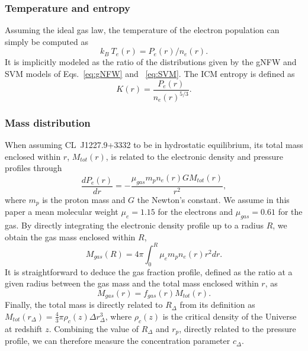 \documentclass[twocolumn,traditabstract]{aa}
\begin{document}
\subsubsection{Temperature and entropy}\label{sec:icm_param_tk}
Assuming the ideal gas law, the temperature of the electron population can simply be computed as
\begin{equation}
	k_B \ T_e(r) = P_e(r) / n_e(r).
	\label{eq:temp_profile}
\end{equation}
It is implicitly modeled as the ratio of the distributions given by the gNFW and SVM models of Eqs.~\ref{eq:gNFW} and ~\ref{eq:SVM}.
The ICM entropy is defined as \citep[see review from][]{voit2005}
\begin{equation}
	K(r) =  \frac{P_e(r)}{n_e(r)^{5/3}}.
	\label{eq:entropy_profile1}
\end{equation}

\subsubsection{Mass distribution}\label{sec:icm_param_mass}
When assuming \mbox{CL~J1227.9+3332} to be in hydrostatic equilibrium, its total mass enclosed within $r$, $M_{tot}(r)$, is related to the electronic density and pressure profiles through
\begin{equation}
	\frac{dP_e(r)}{dr} = -\frac{\mu_{gas} m_p n_e(r) G M_{tot}(r)}{r^2},
	\label{eq:hse}
\end{equation}
where $m_p$ is the proton mass and $G$ the Newton's constant. We assume in this paper a mean molecular weight $\mu_e = 1.15$ for the electrons and $\mu_{gas} = 0.61$ for the gas. By directly integrating the electronic density profile up to a radius $R$, we obtain the gas mass enclosed within $R$,
\begin{equation}
	M_{gas}(R) = 4 \pi \int_0^R \mu_e m_p n_e(r) r^2 dr.
	\label{eq:gas_mass}
\end{equation}
It is straightforward to deduce the gas fraction profile, defined as the ratio at a given radius between the gas mass and the total mass enclosed within $r$, as
\begin{equation}
	M_{gas}(r) = f_{gas}(r) M_{tot}(r).
	\label{eq:gas_frac}
\end{equation}
Finally, the total mass is directly related to $R_{\Delta}$ from its definition as $M_{tot}(r_{\Delta}) = \frac{4}{3} \pi \rho_c(z) \Delta r_{\Delta}^3$, where $\rho_c(z)$ is the critical density of the Universe at redshift $z$. Combining the value of $R_{\Delta}$ and $r_p$, directly related to the pressure profile, we can therefore measure the concentration parameter $c_{\Delta}$.
\end{document}
